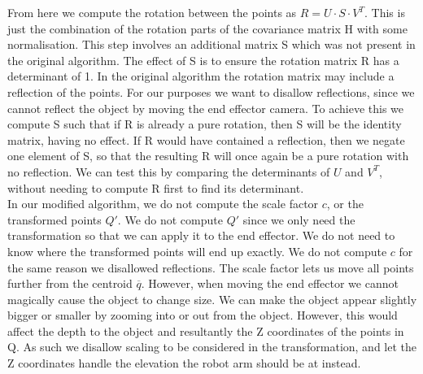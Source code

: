 From here we compute the rotation between the points as $R = U \cdot S \cdot V^T$. This is just the combination of the rotation parts of the covariance matrix H with some normalisation. This step involves an additional matrix S which was not present in the original algorithm. The effect of S is to ensure the rotation matrix R has a determinant of 1. In the original algorithm the rotation matrix may include a reflection of the points. For our purposes we want to disallow reflections, since we cannot reflect the object by moving the end effector camera. To achieve this we compute S such that if R is already a pure rotation, then S will be the identity matrix, having no effect. If R would have contained a reflection, then we negate one element of S, so that the resulting R will once again be a pure rotation with no reflection. We can test this by comparing the determinants of $U$ and $V^T$, without needing to compute R first to find its determinant.\\


In our modified algorithm, we do not compute the scale factor $c$, or the transformed points $Q'$. We do not compute $Q'$ since we only need the transformation so that we can apply it to the end effector. We do not need to know where the transformed points will end up exactly. We do not compute $c$ for the same reason we disallowed reflections. The scale factor lets us move all points further from the centroid $\overline{q}$. However, when moving the end effector we cannot magically cause the object to change size. We can make the object appear slightly bigger or smaller by zooming into or out from the object. However, this would affect the depth to the object and resultantly the Z coordinates of the points in Q. As such we disallow scaling to be considered in the transformation, and let the Z coordinates handle the elevation the robot arm should be at instead.\\

